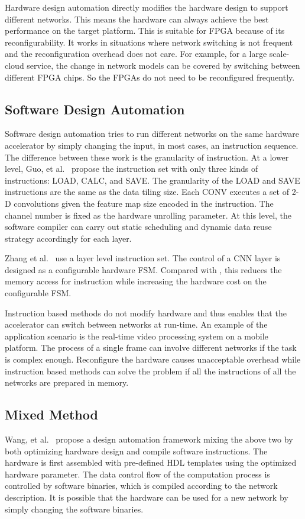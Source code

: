 Hardware design automation directly modifies the hardware design to support different networks. This means the hardware can always achieve the best performance on the target platform. This is suitable for FPGA because of its reconfigurability. It works in situations where network switching is not frequent and the reconfiguration overhead does not care. For example, for a large scale-cloud service, the change in network models can be covered by switching between different FPGA chips. So the FPGAs do not need to be reconfigured frequently.

\subsection{Software Design Automation}

Software design automation tries to run different networks on the same hardware accelerator by simply changing the input, in most cases, an instruction sequence. The difference between these work is the granularity of instruction. At a lower level, Guo, et al.~\cite{guo2017angel} propose the instruction set with only three kinds of instructions: LOAD, CALC, and SAVE. The granularity of the LOAD and SAVE instructions are the same as the data tiling size. Each CONV executes a set of 2-D convolutions given the feature map size encoded in the instruction. The channel number is fixed as the hardware unrolling parameter. At this level, the software compiler can carry out static scheduling and dynamic data reuse strategy accordingly for each layer. 

Zhang et al.~\cite{zhang2016caffeine} use a layer level instruction set. The control of a CNN layer is designed as a configurable hardware FSM. Compared with \cite{guo2017angel}, this reduces the memory access for instruction while increasing the hardware cost on the configurable FSM.

Instruction based methods do not modify hardware and thus enables that the accelerator can switch between networks at run-time. An example of the application scenario is the real-time video processing system on a mobile platform. The process of a single frame can involve different networks if the task is complex enough. Reconfigure the hardware causes unacceptable overhead while instruction based methods can solve the problem if all the instructions of all the networks are prepared in memory.

\subsection{Mixed Method}
Wang, et al.~\cite{wang2016deepburning} propose a design automation framework mixing the above two by both optimizing hardware design and compile software instructions. The hardware is first assembled with pre-defined HDL templates using the optimized hardware parameter. The data control flow of the computation process is controlled by software binaries, which is compiled according to the network description. It is possible that the hardware can be used for a new network by simply changing the software binaries.

